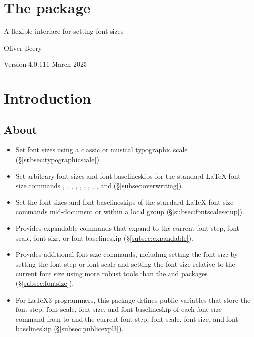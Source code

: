 \documentclass{beery}
\begin{document}
\section*
  {%
    The  package%
  }

A flexible interface for setting font sizes

Oliver Beery

Version 4.0.1\quad{}11 March 2025


\section{Introduction}
\label{sec:intro}

\subsection{About}
\label{subsec:about}

\begin{itemize}
  \item
  Set font sizes using a classic or musical typographic scale (\S\ref{subsec:typographicscale}).
  \item
  Set arbitrary font sizes and font baselineskips for the standard \LaTeX{} font size commands , , , , , , , , , and  (\S\ref{subsec:overwriting}).
  \item
  Set the font sizes and font baselineskips of the standard \LaTeX{} font size commands mid-document or within a local group (\S\ref{subsec:fontscalesetup}).
  \item
  Provides expandable commands that expand to the current font step, font scale, font size, or font baselineskip (\S\ref{subsec:expandable}).
  \item
  Provides additional font size commands, including setting the font size by setting the font step or font scale and setting the font size relative to the current font size using more robust tools than the  and  packages (\S\ref{subsec:fontsize}).
  \item
  For \LaTeX3 programmers, this package defines public  variables that store the font step, font scale, font size, and font baselineskip of each font size command from  to  and the current font step, font scale, font size, and font baselineskip (\S\ref{subsec:publicexpl3}).
\end{itemize}
\end{document}
